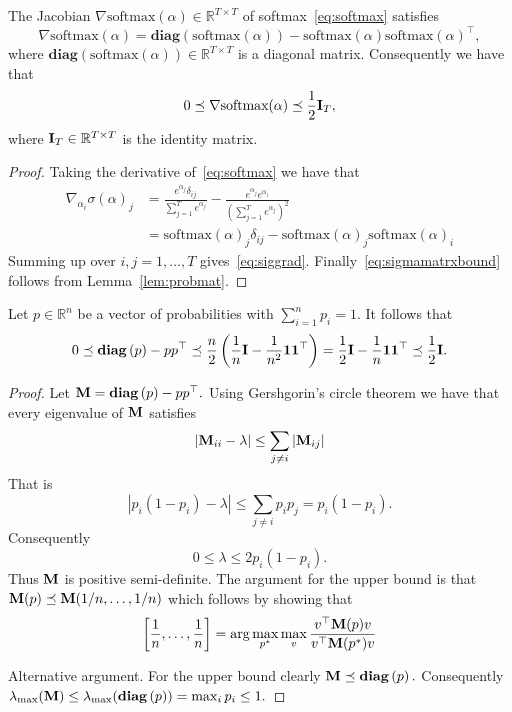 \documentclass[11pt]{article}
\newcommand{\R}{\mathbb{R}} %
\newcommand{\diag}[1]{\mathbf{diag}\left( #1\right)}
\newcommand{\mI}{{\bf I}}
\newcommand{\mM}{{\bf M}}
\newcommand{\ones}{{\bf 1}}
\begin{document}
\begin{lemma}
The Jacobian $\nabla \textrm{softmax}(\alpha) \in \R^{T \times T}$ of  softmax~\eqref{eq:softmax} satisfies
\begin{equation}\label{eq:siggrad}
     \nabla \textrm{softmax}(\alpha)  = \diag{\textrm{softmax}(\alpha)} -\textrm{softmax}(\alpha)\textrm{softmax}(\alpha)^\top, 
\end{equation}
where $\diag{\textrm{softmax}(\alpha)} \in \R^{T \times T}$ is a diagonal matrix. Consequently we have that
\begin{equation}\label{eq:sigmamatrxbound}
  0  \preceq \nabla \textrm{softmax}(\alpha) \preceq \frac{1}{2} \mI_T,
\end{equation}
where $\mI_T \in \R^{T \times T}$ is the identity matrix. 
\end{lemma}
\begin{proof}
Taking the derivative of~\eqref{eq:softmax} we have that
    \begin{align*}
    \nabla_{\alpha_i} \sigma (\alpha)_j &=  \frac{e^{\alpha_j} \delta_{ij}}{\sum_{j=1}^T e^{\alpha_j}} -\frac{e^{\alpha_j}e^{\alpha_i}}{(\sum_{j=1}^T e^{\alpha_j})^2}  \\
    &= \textrm{softmax}(\alpha)_j \delta_{ij} - \textrm{softmax}(\alpha)_j\textrm{softmax}(\alpha)_i
\end{align*}
    Summing up over $i,j=1,\ldots, T$ gives~\eqref{eq:siggrad}. Finally~\eqref{eq:sigmamatrxbound} follows from Lemma~\ref{lem:probmat}.
\end{proof}



\begin{lemma}\label{lem:probmat}
Let $p \in \R^n$ be a vector of probabilities with $\sum_{i=1}^n p_i =1.$ It follows that
\begin{equation}
 0  \preceq   \diag{p} - p p^\top \preceq  \frac{n}{2} \left( \frac{1}{n}\mI - \frac{1}{n^2}\ones \ones^\top  \right) = \frac{1}{2}\mI - \frac{1}{n}\ones \ones^\top \preceq  \frac{1}{2}\mI .
\end{equation}
\end{lemma}
\begin{proof}
Let $\mM =\diag{p} - p p^\top.$
Using Gershgorin's circle theorem we have that every eigenvalue of $\mM$ satisfies
\[ |\mM_{ii} - \lambda  | \leq \sum_{j\neq i} |\mM_{ij}| \]
That is
\[ |p_i(1-p_i) - \lambda  | \leq \sum_{j\neq i} p_i p_j = p_i(1-p_i). \]
Consequently
\[0 \leq \lambda \leq 2 p_i(1-p_i).\]
Thus $\mM$ is positive semi-definite. The argument for the upper bound is that $\mM(p) \preceq \mM(1/n , \ldots , 1/n)$ which follows by showing that 
\[ \left[ \frac{1}{n}, \ldots, \frac{1}{n}\right]= \arg\max_{p^*} \max_v \frac{v ^\top \mM(p) v}{v ^\top \mM(p^*) v}\]


Alternative argument. For the upper bound clearly $\mM \preceq \diag{p}.$ Consequently $\lambda_{\max}(\mM) \leq \lambda_{\max}(\diag{p}) = \max_i p_i \leq 1.$
\end{proof}
\end{document}
